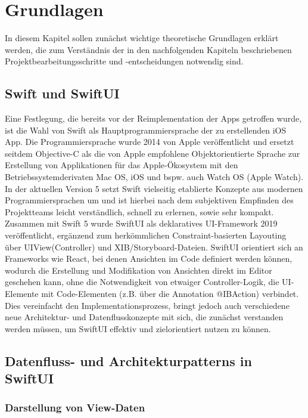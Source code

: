 \chapter{Grundlagen}\label{ch:grundlagen}

In diesem Kapitel sollen zunächst wichtige theoretische Grundlagen erklärt werden, die zum Verständnis der in den nachfolgenden Kapiteln beschriebenen Projektbearbeitungsschritte und -entscheidungen notwendig sind.

\section{Swift und SwiftUI}

Eine Festlegung, die bereits vor der Reimplementation der Apps getroffen wurde, ist die Wahl von Swift als Hauptprogrammiersprache der zu erstellenden iOS App. Die Programmiersprache wurde 2014 von Apple veröffentlicht und ersetzt seitdem Objective-C als die von Apple empfohlene Objektorientierte Sprache zur Erstellung von Applikationen für das Apple-Ökosystem mit den Betriebssystemderivaten Mac OS, iOS und bspw. auch Watch OS (Apple Watch). In der aktuellen Version 5 setzt Swift vielseitig etablierte Konzepte aus modernen Programmiersprachen um und ist hierbei nach dem subjektiven Empfinden des Projektteams leicht verständlich, schnell zu erlernen, sowie sehr kompakt. Zusammen mit Swift 5 wurde SwiftUI als deklaratives UI-Framework 2019 veröffentlicht, ergänzend zum herkömmlichen Constraint-basierten Layouting über UIView(Controller) und XIB/Storyboard-Dateien. SwiftUI orientiert sich an Frameworks wie React, bei denen Ansichten im Code definiert werden können, wodurch die Erstellung und Modifikation von Ansichten direkt im Editor geschehen kann, ohne die Notwendigkeit von etwaiger Controller-Logik, die UI-Elemente mit Code-Elementen (z.B. über die Annotation @IBAction) verbindet. Dies vereinfacht den Implementationsprozess, bringt jedoch auch verschiedene neue Architektur- und Datenflusskonzepte mit sich, die zunächst verstanden werden müssen, um SwiftUI effektiv und zielorientiert nutzen zu können.

\section{Datenfluss- und Architekturpatterns in SwiftUI}

\subsection{Darstellung von View-Daten}

